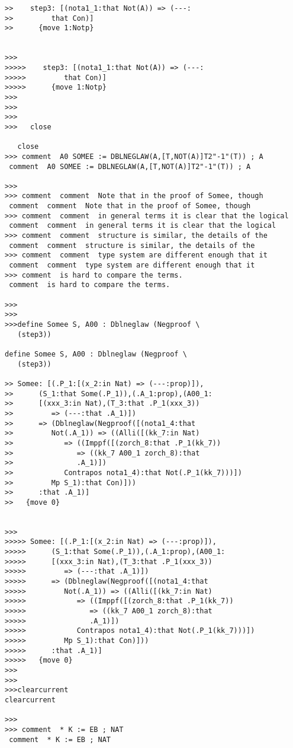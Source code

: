 \documentclass{article}
\begin{document}
\begin{verbatim}
>>    step3: [(nota1_1:that Not(A)) => (---:
>>         that Con)]
>>      {move 1:Notp}


>>>
>>>>>    step3: [(nota1_1:that Not(A)) => (---:
>>>>>         that Con)]
>>>>>      {move 1:Notp}
>>>
>>>
>>>
>>>   close

   close
>>> comment  A0 SOMEE := DBLNEGLAW(A,[T,NOT(A)]T2"-1"(T)) ; A
 comment  A0 SOMEE := DBLNEGLAW(A,[T,NOT(A)]T2"-1"(T)) ; A

>>>
>>> comment  comment  Note that in the proof of Somee, though
 comment  comment  Note that in the proof of Somee, though
>>> comment  comment  in general terms it is clear that the logical
 comment  comment  in general terms it is clear that the logical
>>> comment  comment  structure is similar, the details of the 
 comment  comment  structure is similar, the details of the 
>>> comment  comment  type system are different enough that it
 comment  comment  type system are different enough that it
>>> comment  is hard to compare the terms.
 comment  is hard to compare the terms.

>>>
>>>
>>>define Somee S, A00 : Dblneglaw (Negproof \
   (step3))

define Somee S, A00 : Dblneglaw (Negproof \
   (step3))

>> Somee: [(.P_1:[(x_2:in Nat) => (---:prop)]),
>>      (S_1:that Some(.P_1)),(.A_1:prop),(A00_1:
>>      [(xxx_3:in Nat),(T_3:that .P_1(xxx_3))
>>         => (---:that .A_1)])
>>      => (Dblneglaw(Negproof([(nota1_4:that
>>         Not(.A_1)) => ((Alli([(kk_7:in Nat)
>>            => ((Imppf([(zorch_8:that .P_1(kk_7))
>>               => ((kk_7 A00_1 zorch_8):that
>>               .A_1)])
>>            Contrapos nota1_4):that Not(.P_1(kk_7)))])
>>         Mp S_1):that Con)]))
>>      :that .A_1)]
>>   {move 0}


>>>
>>>>> Somee: [(.P_1:[(x_2:in Nat) => (---:prop)]),
>>>>>      (S_1:that Some(.P_1)),(.A_1:prop),(A00_1:
>>>>>      [(xxx_3:in Nat),(T_3:that .P_1(xxx_3))
>>>>>         => (---:that .A_1)])
>>>>>      => (Dblneglaw(Negproof([(nota1_4:that
>>>>>         Not(.A_1)) => ((Alli([(kk_7:in Nat)
>>>>>            => ((Imppf([(zorch_8:that .P_1(kk_7))
>>>>>               => ((kk_7 A00_1 zorch_8):that
>>>>>               .A_1)])
>>>>>            Contrapos nota1_4):that Not(.P_1(kk_7)))])
>>>>>         Mp S_1):that Con)]))
>>>>>      :that .A_1)]
>>>>>   {move 0}
>>>
>>>
>>>clearcurrent
clearcurrent

>>>
>>> comment  * K := EB ; NAT
 comment  * K := EB ; NAT


\end{verbatim}
\end{document}
